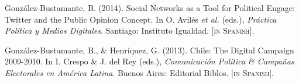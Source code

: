 \begin{publications}
\begin{benumerate}{12}
\item{\small Gonz\'alez-Bustamante, B. (2014). Social Networks as a Tool for Political Engage: Twitter and the Public Opinion Concept. In O. Avil\'es {\itshape et al.} (eds.), {\itshape Pr\'actica Pol\'itica y Medios Digitales}. Santiago: Instituto Igualdad. {\footnotesize \scshape [in Spanish]}.}\vspace{1mm}

\item{\small Gonz\'alez-Bustamante, B., \& Henr\'iquez, G. (2013). Chile: The Digital Campaign 2009-2010. In I. Crespo \& J. del Rey (eds.), {\itshape Comunicaci\'on Pol\'itica \& Campa\~nas Electorales en Am\'erica Latina}. Buenos Aires: Editorial Biblos. {\footnotesize \scshape [in Spanish].}}\vspace{1mm}

\end{benumerate}

\end{publications}
\pagebreak